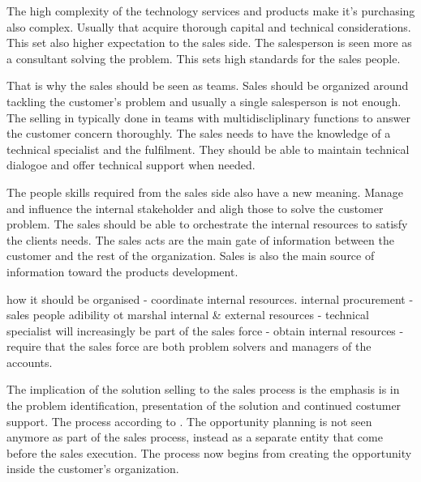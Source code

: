 \documentclass[12pt,a4paper,oneside,pdftex]{report}
\begin{document}
The high complexity of the technology services and products make it's purchasing also complex. Usually that acquire thorough capital and technical considerations. This set also higher expectation to the sales side. The salesperson is seen more as a consultant solving the problem. This sets high standards for the sales people. 

That is why the sales should be seen as teams. Sales should be organized around tackling the customer's problem and usually a single salesperson is not enough. The selling in typically done in teams with multidiscliplinary functions to answer the customer concern thoroughly. The sales needs to have the knowledge of a technical specialist and the fulfilment. They should be able to maintain technical dialogoe and offer technical support when needed.  

The people skills required from the sales side also have a new meaning. Manage and influence the internal stakeholder and aligh those to solve the customer problem. The sales should be able to orchestrate the internal resources to satisfy the clients needs. The sales acts are the main gate of information between the customer and the rest of the organization. Sales is also the main source of information toward the products development.  

how it should be organised
- coordinate internal resources. internal procurement
- sales people adibility ot marshal internal & external resources
- technical specialist will increasingly be part of the sales force
- obtain internal resources
- require that the sales force are both problem solvers and managers of the accounts.

The implication of the solution selling to the sales process is the emphasis is in the problem identification, presentation of the solution and continued costumer support. The process according to \citep{Eades}. The opportunity planning is not seen anymore as part of the sales process, instead as a separate entity that come before the sales execution. The process now begins from creating the opportunity inside the customer's organization. 
\end{document}
